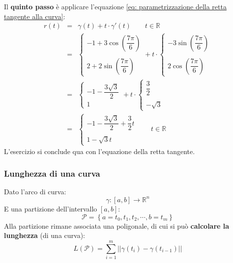 \documentclass[a4paper]{article}
\begin{document}
	\noindent
	Il \textbf{quinto passo} è applicare l'equazione \ref{eq: parametrizzazione della retta tangente alla curva}:
	\begin{equation*}
		\begin{array}{rcl}
			r\left(t\right) &=& \gamma\left(t\right) + t \cdot \gamma'\left(t\right) \hspace{2em} t \in \mathbb{R} \\ [1em]
			&=& \begin{cases}
				-1 + 3 \cos\left(\dfrac{7\pi}{6}\right) \\
				\\
				2  + 2 \sin\left(\dfrac{7\pi}{6}\right)
			\end{cases}
			+
			t \cdot
			\begin{cases}
				-3\sin\left(\dfrac{7\pi}{6}\right) \\ \\
				2\cos\left(\dfrac{7\pi}{6}\right)
			\end{cases} \\ [3.5em]
			&=& 
			\begin{cases}
				-1-\dfrac{3\sqrt{3}}{2} \\
				1
			\end{cases}
			+
			t \cdot
			\begin{cases}
				\dfrac{3}{2} \\ \\
				-\sqrt{3}
			\end{cases} \\ [3em]
			&=&
			\begin{cases}
				-1-\dfrac{3\sqrt{3}}{2} + \dfrac{3}{2}t \\ \\
				1 - \sqrt{3} t
			\end{cases}
			\hspace{2em}
			t \in \mathbb{R}
		\end{array}
	\end{equation*}
	L'esercizio si conclude qua con l'equazione della retta tangente.\newpage

	\subsubsection{Lunghezza di una curva}\label{subsubsection: lunghezza di una curva}

	Dato l'arco di curva:
	\begin{equation*}
		\gamma:\left[a,b\right] \rightarrow \mathbb{R}^{n}
	\end{equation*}
	E una partizione dell'intervallo $\left[a,b\right]$:
	\begin{equation*}
		\mathcal{P} = \left\{a=t_{0}, t_{1}, t_{2}, \cdots, b = t_{m}\right\}
	\end{equation*}
	Alla partizione rimane associata una poligonale, di cui si può \textbf{calcolare la lunghezza} (di una curva):
	\begin{equation}\label{eq: lunghezza di una curva}
		L\left(\mathcal{P}\right) = \displaystyle\sum_{i=1}^{m} \left|\left| \gamma\left(t_{i}\right) - \gamma \left(t_{i-1}\right) \right|\right|
	\end{equation}
\end{document}
